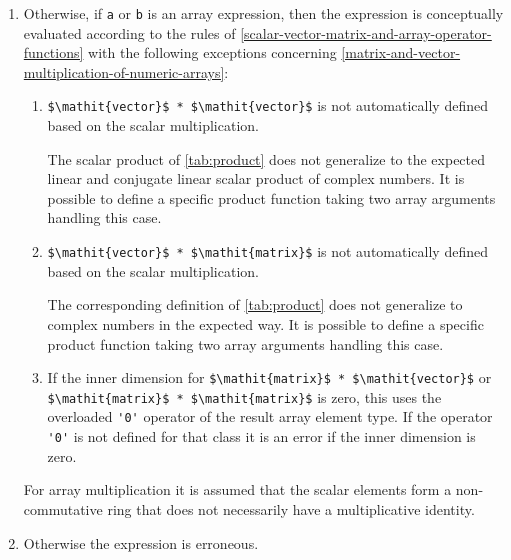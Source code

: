 \begin{enumerate}
\begin{nonnormative}
  Informally, this means:
  If there is no direct match of \lstinline!a $\theop$ b!, then it is tried to find a direct match by automatic type casts of \lstinline!a! or \lstinline!b!, by converting either \lstinline!a! or \lstinline!b! to the needed type using an appropriate constructor function from one of the operator record classes used as arguments of the overloaded \lstinline!op! functions.
  Example using the \lstinline!Complex!-definition below:
\begin{lstlisting}[language=modelica]
Real a;
Complex b;
Complex c = a * b; // interpreted as:
// Complex.'*'.multiply(Complex.'constructor'.fromReal(a), b);
\end{lstlisting}
\end{nonnormative}
\item\label{overloaded-binary-arrays}
  Otherwise, if \lstinline!a! or \lstinline!b! is an array expression, then the expression is conceptually evaluated according to the rules of \cref{scalar-vector-matrix-and-array-operator-functions} with the following exceptions concerning \cref{matrix-and-vector-multiplication-of-numeric-arrays}:
  \begin{enumerate}
  \def\labelenumii{\alph{enumii}.}
  \item
    \lstinline!$\mathit{vector}$ * $\mathit{vector}$! is not automatically defined based on the scalar multiplication.
    \begin{nonnormative}
    The scalar product of \cref{tab:product} does not generalize to the expected linear and conjugate linear scalar product of complex numbers.
    It is possible to define a specific product function taking two array arguments handling this case.
    \end{nonnormative}
  \item
    \lstinline!$\mathit{vector}$ * $\mathit{matrix}$! is not automatically defined based on the scalar multiplication.
    \begin{nonnormative}
    The corresponding definition of \cref{tab:product} does not generalize to complex numbers in the expected way.
    It is possible to define a specific product function taking two array arguments handling this case.
    \end{nonnormative}
  \item
    If the inner dimension for \lstinline!$\mathit{matrix}$ * $\mathit{vector}$! or \lstinline!$\mathit{matrix}$ * $\mathit{matrix}$! is zero, this uses the overloaded \lstinline!'0'! operator of the result array element type.
    If the operator \lstinline!'0'! is not defined for that class it is an error if the inner dimension is zero.
  \end{enumerate}

\begin{nonnormative}
For array multiplication it is assumed that the scalar elements form a non-commutative ring that does not necessarily have a multiplicative identity.
\end{nonnormative}

\item\label{overloaded-binary-error}
  Otherwise the expression is erroneous.
\end{enumerate}

